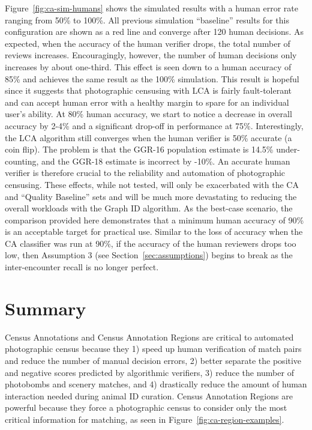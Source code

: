 Figure~\ref{fig:ca-sim-humans} shows the simulated results with a human error rate ranging from 50\% to 100\%.  All previous simulation ``baseline'' results for this configuration are shown as a red line and converge after 120 human decisions.  As expected, when the accuracy of the human verifier drops, the total number of reviews increases.  Encouragingly, however, the number of human decisions only increases by about one-third.  This effect is seen down to a human accuracy of 85\% and achieves the same result as the 100\% simulation.  This result is hopeful since it suggests that photographic censusing with LCA is fairly fault-tolerant and can accept human error with a healthy margin to spare for an individual user's ability.  At 80\% human accuracy, we start to notice a decrease in overall accuracy by 2-4\% and a significant drop-off in performance at 75\%.  Interestingly, the LCA algorithm still converges when the human verifier is 50\% accurate (a coin flip).  The problem is that the GGR-16 population estimate is 14.5\% under-counting, and the GGR-18 estimate is incorrect by -10\%.  An accurate human verifier is therefore crucial to the reliability and automation of photographic censusing.  These effects, while not tested, will only be exacerbated with the CA and ``Quality Baseline'' sets and will be much more devastating to reducing the overall workloads with the Graph ID algorithm.  As the best-case scenario, the comparison provided here demonstrates that a minimum human accuracy of 90\% is an acceptable target for practical use.  Similar to the loss of accuracy when the CA classifier was run at 90\%, if the accuracy of the human reviewers drops too low, then Assumption 3 (see Section~\ref{sec:assumptions}) begins to break as the inter-encounter recall is no longer perfect.

\section{Summary}

Census Annotations and Census Annotation Regions are critical to automated photographic census because they 1) speed up human verification of match pairs and reduce the number of manual decision errors, 2) better separate the positive and negative scores predicted by algorithmic verifiers, 3) reduce the number of photobombs and scenery matches, and 4) drastically reduce the amount of human interaction needed during animal ID curation.  Census Annotation Regions are powerful because they force a photographic census to consider only the most critical information for matching, as seen in Figure~\ref{fig:ca-region-examples}.

